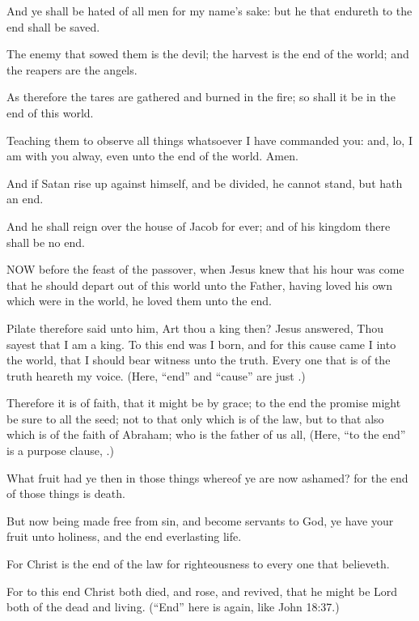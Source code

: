 			\begin{compactdesc}
				\item[Matthew 10:22] And ye shall be hated of all men for my name's sake: but he that endureth to the end shall be saved.
				\item[Matthew 13:39] The enemy that sowed them is the devil; the harvest is the end of the world; and the reapers are the angels.
				\item[Matthew 13:40] As therefore the tares are gathered and burned in the fire; so shall it be in the end of this world.
				\item[Matthew 28:20] Teaching them to observe all things whatsoever I have commanded you: and, lo, I am with you alway, even unto the end of the world. Amen.
				\item[Mark 3:26] And if Satan rise up against himself, and be divided, he cannot stand, but hath an end.
				\item[Luke 1:33] And he shall reign over the house of Jacob for ever; and of his kingdom there shall be no end.
				\item[John 13:1] NOW before the feast of the passover, when Jesus knew that his hour was come that he should depart out of this world unto the Father, having loved his own which were in the world, he loved them unto the end.
				\item[John 18:37] Pilate therefore said unto him, Art thou a king then? Jesus answered, Thou sayest that I am a king. To this end was I born, and for this cause came I into the world, that I should bear witness unto the truth. Every one that is of the truth heareth my voice. (Here, ``end'' and ``cause'' are just .)
				\item[Romans 4:16] Therefore it is of faith, that it might be by grace; to the end the promise might be sure to all the seed; not to that only which is of the law, but to that also which is of the faith of Abraham; who is the father of us all, (Here, ``to the end'' is a purpose clause, .)
				\item[Romans 6:21] What fruit had ye then in those things whereof ye are now ashamed? for the end of those things is death.
				\item[Romans 6:22] But now being made free from sin, and become servants to God, ye have your fruit unto holiness, and the end everlasting life.
				\item[Romans 10:4] For Christ is the end of the law for righteousness to every one that believeth.
				\item[Romans 14:9] For to this end Christ both died, and rose, and revived, that he might be Lord both of the dead and living. (``End'' here is  again, like John 18:37.)

\end{compactdesc}
